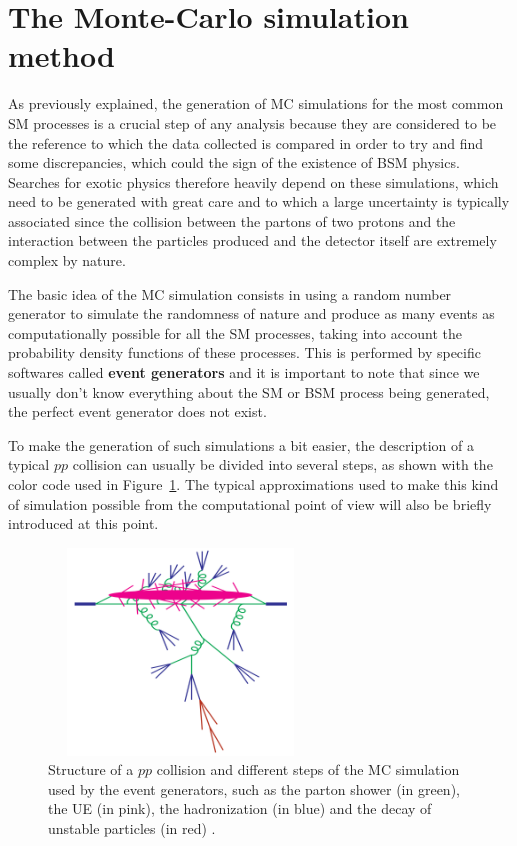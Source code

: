 \documentclass[a4paper, 10pt, openright]{report}
\begin{document}
\section{The Monte-Carlo simulation method} \label{section:MC}

As previously explained, the generation of \ac{MC} simulations for the most common \ac{SM} processes is a crucial step of any analysis because they are considered to be the reference to which the data collected is compared in order to try and find some discrepancies, which could the sign of the existence of \ac{BSM} physics. Searches for exotic physics therefore heavily depend on these simulations, which need to be generated with great care and to which a large uncertainty is typically associated since the collision between the partons of two protons and the interaction between the particles produced and the detector itself are extremely complex by nature. 

The basic idea of the \ac{MC} simulation consists in using a random number generator to simulate the randomness of nature and produce as many events as computationally possible for all the \ac{SM} processes, taking into account the probability density functions of these processes. This is performed by specific softwares called \textbf{event generators} and it is important to note that since we usually don't know everything about the \ac{SM} or \ac{BSM} process being generated, the perfect event generator does not exist.

To make the generation of such simulations a bit easier, the description of a typical $pp$ collision can usually be divided into several steps, as shown with the color code used in Figure~\ref{fig:MCGen}. The typical approximations used to make this kind of simulation possible from the computational point of view will also be briefly introduced at this point.

\begin{figure}[htbp]
\begin{center}
\includegraphics[width=7cm, height=5.5cm]{figs/MCGen.png}
\caption{Structure of a $pp$ collision and different steps of the \ac{MC} simulation used by the event generators, such as the parton shower (in green), the \ac{UE} (in pink), the hadronization (in blue) and the decay of unstable particles (in red) \cite{MCGen}.}
\label{fig:MCGen}
\end{center}
\end{figure}
\end{document}
